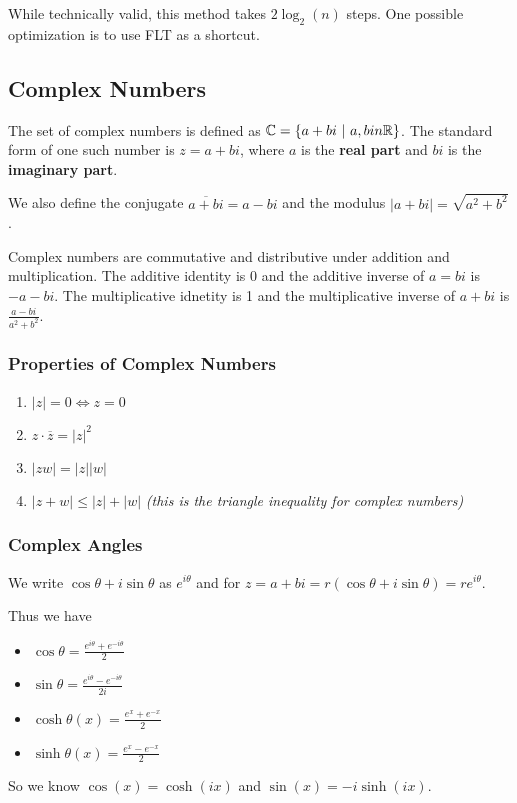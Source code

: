 \documentclass[12pt]{article}
\begin{document}
While technically valid, this method takes $2\log_2 (n)$ steps. One possible optimization is to use FLT as a shortcut.

\subsection*{Complex Numbers}
The set of complex numbers is defined as $\mathbb{C} = \{ a + bi \ |\  a, b in \mathbb{R} \}$. The standard form of one such number is $z = a + bi$, where $a$ is the {\bf real part} and $bi$ is the {\bf imaginary part}.

We also define the conjugate $\overline{a + bi} = a - bi$ and the modulus $|a + bi| = \sqrt{a^2 + b^2}$.

Complex numbers are commutative and distributive under addition and multiplication. The additive identity is 0 and the additive inverse of $a = bi$ is $-a - bi$. The multiplicative idnetity is 1 and the multiplicative inverse of $a + bi$ is $\frac{a-bi}{a^2 + b^2}$.

\subsubsection*{Properties of Complex Numbers}
\begin{enumerate}
\item $|z| = 0 \iff z = 0$
\item $z \cdot \overline{z} = {|z|}^2$
\item $|zw| = |z| |w|$
\item $|z + w| \leq |z| + |w|$ \emph{(this is the triangle inequality for complex numbers)}
\end{enumerate}

\subsubsection*{Complex Angles}
We write $\cos\theta + i \sin\theta$ as $e^{i\theta}$ and for $z = a + bi = r(\cos\theta + i\sin\theta) = re^{i\theta}$.

Thus we have
\begin{itemize}
\item $\cos\theta = \frac{e^{i\theta} + e^{-i\theta}}{2}$
\item $\sin\theta = \frac{e^{i\theta} - e^{-i\theta}}{2i}$
\item $\cosh\theta(x) = \frac{e^x + e^{-x}}{2}$
\item $\sinh\theta(x) = \frac{e^x - e^{-x}}{2}$
\end{itemize}
So we know $\cos(x) = \cosh(ix)$ and $\sin(x) = -i\sinh(ix)$.
\end{document}
